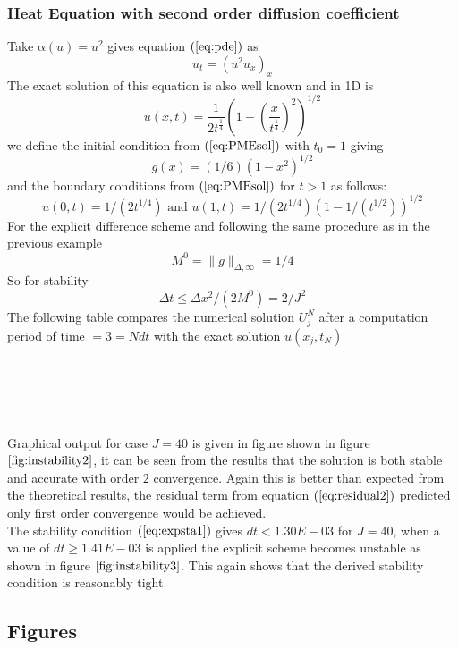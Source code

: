 \documentclass[11pt]{article}
\newcommand{\D}{\Delta}
\newcommand{\al}{\mathrm{\alpha}}
\begin{document}
\subsubsection{Heat Equation with second order diffusion coefficient}
Take $\al(u) = u^2 $ gives equation $(\ref{eq:pde})$ as
\begin{equation} 
u_t = (u^2u_x)_x
\end{equation}
The exact solution of this equation is also well known \cite{vazquez2007} and in 1D is
\begin{equation}
\label{eq:PMEsol}
u(x,t) = \frac{1}{2t^{ \frac{1}{4} }  }\left(  1-\left(    \frac{x }{t^{\frac{1}{4}  }  } \right)^2  \right) ^{1/2}
\end{equation}
we define the initial condition from $(\ref{eq:PMEsol})$ with $t_0 = 1$ giving
\begin{equation}
\label{eq:PMEini}
 g(x) = (1/6)(1-x^2)^{1/2}
\end{equation}
and the boundary conditions from $(\ref{eq:PMEsol})$ for $t > 1$ as follows:
$$ u(0,t) = 1/(2t^{1/4}) \text{ and } u(1,t) = 1/(2t^{1/4})\left(1-1/(t^{1/2})\right)^{1/2}$$
For the explicit difference scheme and following the same procedure as in the previous example 
$$M^0 = \|g\|_{\D,\infty} = 1/4$$
So for stability $$\D{t} \leq \D{x^2}/(2M^0) = 2/J^2$$
The following table compares the numerical solution $U_j^N$ after a computation period of time $= 3 = Ndt$ with the exact solution $u(x_j,t_N)$ \\
\\
\\
\\
\\
\\Graphical output for case $J=40$ is given in figure shown in figure $\ref{fig:instability2}$, it can be seen from the results that the solution is both stable and accurate with order $2$ convergence. Again this is better than expected from the theoretical results, the residual term from equation $(\ref{eq:residual2})$ predicted only first order convergence would be achieved.
\\The stability condition $(\ref{eq:expsta1})$ gives $dt<1.30E-03$ for $J=40$, when a value of $dt\geq1.41E-03$ is applied the explicit scheme becomes unstable as shown in figure $\ref{fig:instability3}$. This again shows that the derived stability condition is reasonably tight.



\newpage
\subsection{Figures}
\end{document}
